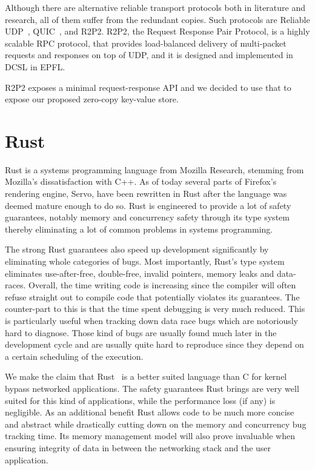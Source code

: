 Although there are alternative reliable transport protocols both in literature and research,
all of them suffer from the redundant copies.
Such protocols are Reliable UDP~\cite{https://www.ietf.org/proceedings/44/I-D/draft-ietf-sigtran-reliable-udp-00.txt},
QUIC~\cite{https://static.googleusercontent.com/media/research.google.com/en//pubs/archive/46403.pdf}, and R2P2.
R2P2, the Request Response Pair Protocol, is a highly scalable RPC protocol,
that provides load-balanced delivery of multi-packet requests and responses on top of UDP,
and it is designed and implemented in DCSL in EPFL.

R2P2 exposes a minimal request-response API and we decided to use that to expose our proposed zero-copy key-value store.

\section{Rust}

Rust is a systems programming language from Mozilla Research, stemming
from Mozilla's dissatisfaction with C++. As of today several parts of
Firefox's rendering engine, Servo, have been rewritten in Rust after
the language was deemed mature enough to do so. Rust is engineered to
provide a lot of safety guarantees, notably memory and concurrency
safety through its type system thereby eliminating a lot of common
problems in systems programming.

The strong Rust guarantees also speed up development significantly by
eliminating whole categories of bugs. Most importantly, Rust's type system
eliminates use-after-free, double-free, invalid pointers, memory leaks
and data-races. Overall, the time writing code is increasing since the
compiler will often refuse straight out to compile code that
potentially violates its guarantees. The counter-part to this is that
the time spent debugging is very much reduced. This is particularly
useful when tracking down data race bugs which are notoriously hard to
diagnose. Those kind of bugs are usually found much later in the
development cycle and are usually quite hard to reproduce since they
depend on a certain scheduling of the execution.

We make the claim that Rust~\cite{rustbook} is a better suited
language than C for kernel bypass networked applications. The safety
guarantees Rust brings are very well suited for this kind of
applications, while the performance loss (if any) is negligible. As an
additional benefit Rust allows code to be much more concise and
abstract while drastically cutting down on the memory and concurrency
bug tracking time. Its memory management model will also prove
invaluable when ensuring integrity of data in between the networking
stack and the user application.

